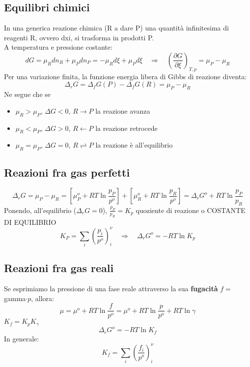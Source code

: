 \documentclass{article}
\newcommand{\So}{\quad \Rightarrow \quad}
\begin{document}
\subsection{Equilibri chimici}
In una generica reazione chimica (R a dare P) una quantità infinitesima di reagenti R, ovvero d\gls{xi}, si trasforma in prodotti P. \\
A temperatura e pressione costante:
\begin{equation*}
    dG=\mu_Rdn_R+\mu_Pdn_P=-\mu_Rd\xi+\mu_Pd\xi \So (\frac{\partial G}{\partial \xi})_{T,p}=\mu_P-\mu_R
\end{equation*}
Per una variazione finita, la funzione energia libera di Gibbs di reazione diventa:
\begin{equation*}
    \Delta_rG=\Delta_fG(P)-\Delta_fG(R)=\mu_P-\mu_R
\end{equation*}
Ne segue che se
\begin{itemize}
    \item $\mu_R>\mu_P$, $\Delta G<0$, $R\rightarrow P$ la reazione avanza 
    \item $\mu_R<\mu_P$, $\Delta G>0$, $R\leftarrow P$ la reazione retrocede
    \item $\mu_R=\mu_P$, $\Delta G=0$, $R \rightleftharpoons  P$ la reazione è all'equilibrio
\end{itemize}


\subsection{Reazioni fra gas perfetti}

\begin{equation*}
    \Delta_rG=\mu_P-\mu_R=\left[\mu_P^o+RT\ln{\frac{p_P}{p^o}}\right]+\left[\mu_R^o+RT\ln{\frac{p_R}{p^o}}\right]=\Delta_rG^o+RT\ln\frac{p_P}{p_R}
\end{equation*}
Ponendo, all'equilibrio ($\Delta_rG=0$), $\frac{p_P}{p_R}=K_p$ quoziente di reazione o COSTANTE DI EQUILIBRIO
\begin{equation}
    K_P=\sum_i\left(\frac{p_i}{p^o}\right)^\nu_i \So \Delta_rG^o=-RT\ln K_p
\end{equation}

\subsection{Reazioni fra gas reali}
Se esprimiamo la pressione di una fase reale attraverso la sua \textbf{fugacità} $f=$\gls{gamma}$\cdot p$, allora:
\begin{equation*}
    \mu=\mu^o+RT\ln\frac{f}{p^o}=\mu^o+RT\ln\frac{p}{p^o}+RT\ln\gamma
\end{equation*}
$K_f=K_pK_\gamma$
\begin{equation*}
    \Delta_rG^o=-RT\ln K_f
\end{equation*}
In generale:
\begin{equation*}
    K_f=\sum_i\left(\frac{f_i}{p^o}\right)^\nu_i
\end{equation*}
\end{document}

